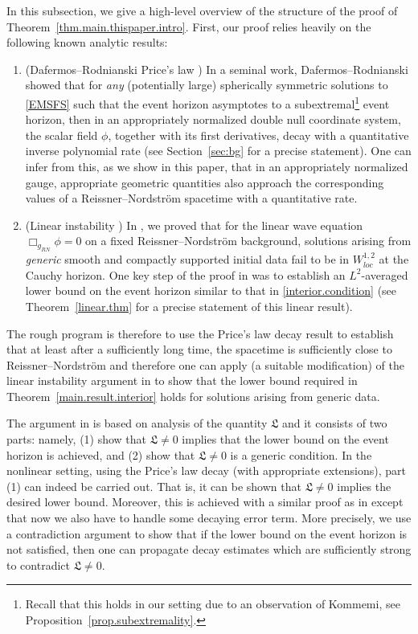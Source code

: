 \documentclass[10pt, reqno]{amsart}
\theoremstyle{definition}
\theoremstyle{remark}
\theoremstyle{conjecture}
\numberwithin{equation}{section}
\newcommand{\0}{\emptyset}
\begin{document}
In this subsection, we give a high-level overview of the structure of the proof of Theorem~\ref{thm.main.thispaper.intro}. First, our proof relies heavily on the following known analytic results:
\begin{enumerate}
\item (Dafermos--Rodnianski Price's law \cite{DRPL}) In a seminal work, Dafermos--Rodnianski \cite{DRPL} showed that for \emph{any} (potentially large) spherically symmetric solutions to \eqref{EMSFS} such that the event horizon asymptotes to a subextremal\footnote{Recall that this holds in our setting due to an observation of Kommemi, see Proposition~\ref{prop.subextremality}.} event horizon, then in an appropriately normalized double null coordinate system, the scalar field $\phi$, together with its first derivatives, decay with a quantitative inverse polynomial rate (see Section~\ref{sec:bg} for a precise statement). One can infer from this, as we show in this paper, that in an appropriately normalized gauge, appropriate geometric quantities also approach the corresponding values of a Reissner--Nordstr\"om spacetime with a quantitative rate.
\item (Linear instability \cite{LO.instab}) In \cite{LO.instab}, we proved that for the linear wave equation $\Box_{g_{RN}}\phi=0$ on a fixed Reissner--Nordstr\"om background, solutions arising from \emph{generic} smooth and compactly supported initial data fail to be in $W^{1,2}_{loc}$ at the Cauchy horizon. One key step of the proof in \cite{LO.instab} was to establish an $L^2$-averaged lower bound on the event horizon similar to that in \eqref{interior.condition} (see Theorem~\ref{linear.thm} for a precise statement of this linear result).
\end{enumerate}

The rough program is therefore to use the Price's law decay result to establish that at least after a sufficiently long time, the spacetime is sufficiently close to Reissner--Nordstr\"om and therefore one can apply (a suitable modification) of the linear instability argument in \cite{LO.instab} to show that the lower bound required in Theorem~\ref{main.result.interior} holds for solutions arising from generic data. 

The argument in \cite{LO.instab} is based on analysis of the quantity $\mathfrak L$ and it consists of two parts: namely, (1) show that $\mathfrak L\neq 0$ implies that the lower bound on the event horizon is achieved, and (2) show that $\mathfrak L\neq 0$ is a generic condition. In the nonlinear setting, using the Price's law decay (with appropriate extensions), part (1) can indeed be carried out. That is, it can be shown that $\mathfrak L\neq 0$ implies the desired lower bound. Moreover, this is achieved with a similar proof as in \cite{LO.instab} except that now we also have to handle some decaying error term. More precisely, we use a contradiction argument to show that if the lower bound on the event horizon is not satisfied, then one can propagate decay estimates which are sufficiently strong to contradict $\mathfrak L\neq 0$.
\end{document}
